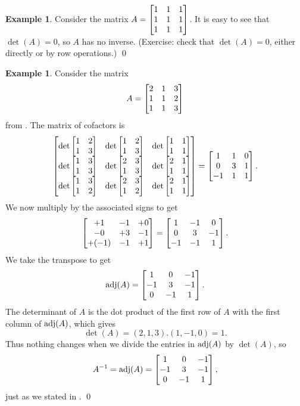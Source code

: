 \documentclass[a4paper]{book}
\theoremstyle{definition}
\newtheorem{example}[theorem]{Example}
\begin{document}
\begin{example}
 Consider the matrix $A=\begin{bmatrix} 1&1&1\\1&1&1\\1&1&1\end{bmatrix}$.  It is easy to
 see that $\det(A)=0$, so $A$ has no inverse.  (Exercise: check that
 $\det(A)=0$, either directly or by row operations.)
 \qed
\end{example}
\begin{example}
 Consider the matrix 
 \[ A = \begin{bmatrix} 2&1&3\\
             1&1&2\\
             1&1&3 \end{bmatrix}
 \]
 from .  The matrix of cofactors is 
 \[ \begin{bmatrix} \det\begin{bmatrix} 1&2\\1&3\end{bmatrix} &
         \det\begin{bmatrix} 1&2\\1&3\end{bmatrix} &
         \det\begin{bmatrix} 1&1\\1&1\end{bmatrix} \\
         \det\begin{bmatrix} 1&3\\1&3\end{bmatrix} &
         \det\begin{bmatrix} 2&3\\1&3\end{bmatrix} &
         \det\begin{bmatrix} 2&1\\1&1\end{bmatrix} \\
         \det\begin{bmatrix} 1&3\\1&2\end{bmatrix} &
         \det\begin{bmatrix} 2&3\\1&2\end{bmatrix} &
         \det\begin{bmatrix} 2&1\\1&1\end{bmatrix}  \end{bmatrix} = 
    \begin{bmatrix} 1&1&0 \\ 0&3&1 \\ -1&1&1 \end{bmatrix}.
 \]
 We now multiply by the associated signs to get
 \[ \begin{bmatrix} +1&-1&+0 \\ -0&+3&-1 \\ +(-1)&-1&+1 \end{bmatrix} = 
    \begin{bmatrix} 1&-1&0 \\ 0&3&-1 \\ -1&-1&1 \end{bmatrix}.
 \]
 We take the transpose to get 
 \[ \operatorname{adj}(A) = \begin{bmatrix} 1&0&-1 \\ -1&3&-1 \\ 0&-1&1 \end{bmatrix}. \]
 The determinant of $A$ is the dot product of the first row of $A$
 with the first column of $\operatorname{adj}(A)$, which gives
 \[ \det(A) = (2,1,3).(1,-1,0) = 1. \]
 Thus nothing changes when we divide the entries in $\operatorname{adj}(A)$ by
 $\det(A)$, so 
 \[ A^{-1} = \operatorname{adj}(A) = \begin{bmatrix} 1&0&-1 \\ -1&3&-1 \\ 0&-1&1 \end{bmatrix}, \]
 just as we stated in .
 \qed
\end{example}
\end{document}

